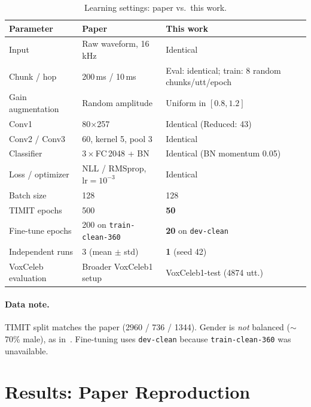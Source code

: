 \documentclass[11pt,a4paper]{article}
\begin{document}
\begin{table}[H]
\centering
\caption{Learning settings: paper vs.\ this work.}
\label{tab:hparams}
\begin{tabular}{@{}lll@{}}
\toprule
\textbf{Parameter} & \textbf{Paper} & \textbf{This work} \\
\midrule
Input                 & Raw waveform, 16\,kHz          & Identical \\
Chunk / hop           & 200\,ms / 10\,ms               & Eval: identical; train: 8 random chunks/utt/epoch \\
Gain augmentation     & Random amplitude               & Uniform in $[0.8,1.2]$ \\
Conv1                 & 80$\times$257                  & Identical (Reduced: 43) \\
Conv2 / Conv3         & 60, kernel 5, pool 3           & Identical \\
Classifier            & $3\times$FC\,2048 + BN         & Identical (BN momentum 0.05) \\
Loss / optimizer      & NLL / RMSprop, $\mathrm{lr}{=}10^{-3}$ & Identical \\
Batch size            & 128                            & 128 \\
TIMIT epochs          & 500                            & \textbf{50} \\
Fine-tune epochs      & 200 on \texttt{train-clean-360}& \textbf{20} on \texttt{dev-clean} \\
Independent runs      & 3 (mean $\pm$ std)             & \textbf{1} (seed 42) \\
VoxCeleb evaluation   & Broader VoxCeleb1 setup        & VoxCeleb1-test (4874 utt.) \\
\bottomrule
\end{tabular}
\end{table}

\paragraph{Data note.}
TIMIT split matches the paper (2960 / 736 / 1344). Gender is \emph{not} balanced ($\sim$70\% male), as in~\cite{fayyazi2023}. Fine-tuning uses \texttt{dev-clean} because \texttt{train-clean-360} was unavailable.

\section{Results: Paper Reproduction}
\end{document}
